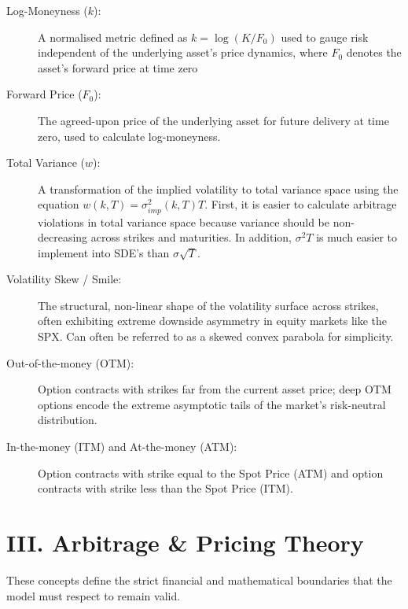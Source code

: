 \documentclass[12pt,oneside]{report}
\theoremstyle{definition}
\theoremstyle{remark}
\begin{document}
\begin{description}
    \item[Log-Moneyness ($k$):] A normalised metric defined as $k = \log(K/F_0)$ used to gauge risk independent of the underlying asset's price dynamics, where $F_0$ denotes the asset’s forward price at time zero
    \item[Forward Price ($F_0$):] The agreed-upon price of the underlying asset for future delivery at time zero, used to calculate log-moneyness.
    \item[Total Variance ($w$):] A transformation of the implied volatility to total variance space using the equation $w(k, T) = \sigma_{imp}^2(k, T)T$. First, it is easier to calculate arbitrage violations in total variance space because variance should be non-decreasing across strikes and maturities. In addition, $\sigma^2T$ is much easier to implement into SDE's than $\sigma \sqrt{T}$.
    \item[Volatility Skew / Smile:] The structural, non-linear shape of the volatility surface across strikes, often exhibiting extreme downside asymmetry in equity markets like the SPX. Can often be referred to as a skewed convex parabola for simplicity.
    \item[Out-of-the-money (OTM):] Option contracts with strikes far from the current asset price; deep OTM options encode the extreme asymptotic tails of the market's risk-neutral distribution.
    \item[In-the-money (ITM) and At-the-money (ATM):] Option contracts with strike equal to the Spot Price (ATM) and option contracts with strike less than the Spot Price (ITM).
\end{description}

\newpage
\section*{III. Arbitrage \& Pricing Theory}
{}
\label{sec:glossary_arbitrage_pricing_theory}
These concepts define the strict financial and mathematical boundaries that the model must respect to remain valid.
\end{document}
